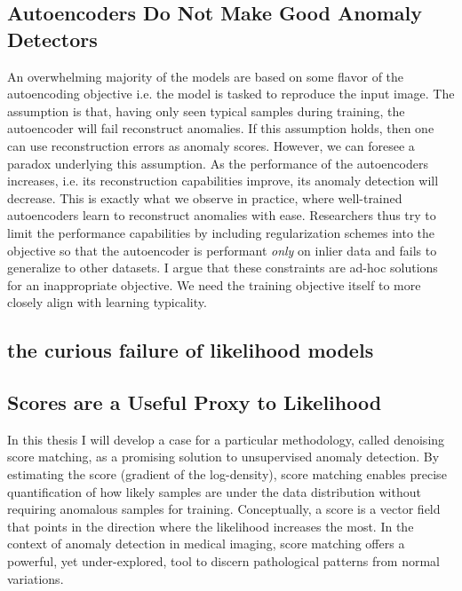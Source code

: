 \subsection*{Autoencoders Do Not Make Good Anomaly Detectors}
An overwhelming majority of the models are based on some flavor of the autoencoding objective i.e. the model is tasked to reproduce the input image. The assumption is that, having only seen typical samples during training, the autoencoder will fail reconstruct anomalies. If this assumption holds, then one can use reconstruction errors as anomaly scores. However, we can foresee a paradox underlying this assumption. As the performance of the autoencoders increases, i.e. its reconstruction capabilities improve, its anomaly detection will decrease. This is exactly what we observe in practice, where well-trained autoencoders learn to reconstruct anomalies with ease. Researchers thus try to limit the performance capabilities by including regularization schemes into the objective so that the autoencoder is performant \textit{only} on inlier data and fails to generalize to other datasets. I argue that these constraints are ad-hoc solutions for an inappropriate objective. We need the training objective itself to more closely align with learning typicality. 

\subsection*{the curious failure of likelihood models}


\subsection*{Scores are a Useful Proxy to Likelihood}

In this thesis I will develop a case for a particular methodology, called denoising score matching, as a promising solution to unsupervised anomaly detection. By estimating the score (gradient of the log-density), score matching enables precise quantification of how likely samples are under the data distribution without requiring anomalous samples for training. Conceptually, a score is a vector field that points in the direction where the likelihood increases the most. In the context of anomaly detection in medical imaging, score matching offers a powerful, yet under-explored, tool to discern pathological patterns from normal variations.


